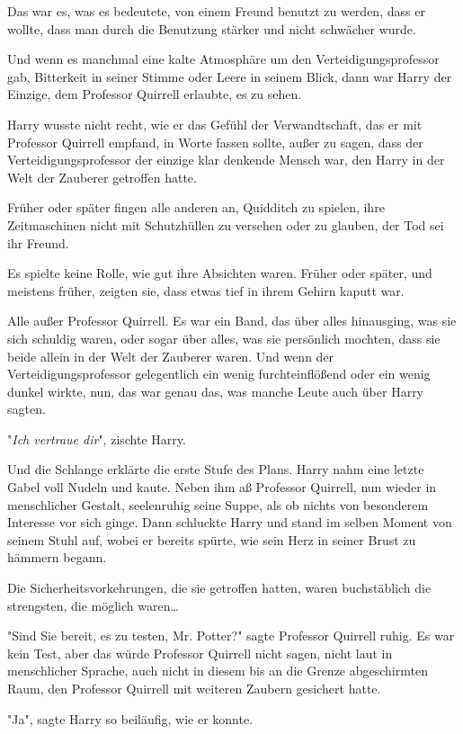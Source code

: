 {Das war es, was es bedeutete, von einem Freund benutzt zu werden, dass er wollte, dass man durch die Benutzung stärker und nicht schwächer wurde.

Und wenn es manchmal eine kalte Atmosphäre um den Verteidigungsprofessor gab, Bitterkeit in seiner Stimme oder Leere in seinem Blick, dann war Harry der Einzige, dem Professor Quirrell erlaubte, es zu sehen.

Harry wusste nicht recht, wie er das Gefühl der Verwandtschaft, das er mit Professor Quirrell empfand, in Worte fassen sollte, außer zu sagen, dass der Verteidigungsprofessor der einzige klar denkende Mensch war, den Harry in der Welt der Zauberer getroffen hatte.

Früher oder später fingen alle anderen an, Quidditch zu spielen, ihre Zeitmaschinen nicht mit Schutzhüllen zu versehen oder zu glauben, der Tod sei ihr Freund.

Es spielte keine Rolle, wie gut ihre Absichten waren. Früher oder später, und meistens früher, zeigten sie, dass etwas tief in ihrem Gehirn kaputt war.

Alle außer Professor Quirrell. Es war ein Band, das über alles hinausging, was sie sich schuldig waren, oder sogar über alles, was sie persönlich mochten, dass sie beide allein in der Welt der Zauberer waren. Und wenn der Verteidigungsprofessor gelegentlich ein wenig furchteinflößend oder ein wenig dunkel wirkte, nun, das war genau das, was manche Leute auch über Harry sagten.

"\emph{Ich vertraue dir}", zischte Harry.

Und die Schlange erklärte die erste Stufe des Plans. Harry nahm eine letzte Gabel voll Nudeln und kaute. Neben ihm aß Professor Quirrell, nun wieder in menschlicher Gestalt, seelenruhig seine Suppe, als ob nichts von besonderem Interesse vor sich ginge. Dann schluckte Harry und stand im selben Moment von seinem Stuhl auf, wobei er bereits spürte, wie sein Herz in seiner Brust zu hämmern begann.

Die Sicherheitsvorkehrungen, die sie getroffen hatten, waren buchstäblich die strengsten, die möglich waren…

"Sind Sie bereit, es zu testen, Mr. Potter?" sagte Professor Quirrell ruhig. Es war kein Test, aber das würde Professor Quirrell nicht sagen, nicht laut in menschlicher Sprache, auch nicht in diesem bis an die Grenze abgeschirmten Raum, den Professor Quirrell mit weiteren Zaubern gesichert hatte.

"Ja", sagte Harry so beiläufig, wie er konnte.

}
